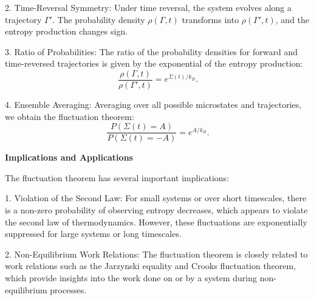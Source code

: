 \begin{appendices}
2. Time-Reversal Symmetry: Under time reversal, the system evolves along a trajectory $\Gamma'$. The probability density $\rho(\Gamma, t)$ transforms into $\rho(\Gamma', t)$, and the entropy production changes sign.

3. Ratio of Probabilities: The ratio of the probability densities for forward and time-reversed trajectories is given by the exponential of the entropy production:
\begin{equation}
	\frac{\rho(\Gamma, t)}{\rho(\Gamma', t)} = e^{\Sigma(t)/k_B}.
\end{equation}

4. Ensemble Averaging: Averaging over all possible microstates and trajectories, we obtain the fluctuation theorem:
\begin{equation}
	\frac{P(\Sigma(t) = A)}{P(\Sigma(t) = -A)} = e^{A/k_B}.
\end{equation}

\textbf{Implications and Applications}

The fluctuation theorem has several important implications:

1. Violation of the Second Law: For small systems or over short timescales, there is a non-zero probability of observing entropy decreases, which appears to violate the second law of thermodynamics. However, these fluctuations are exponentially suppressed for large systems or long timescales.

2. Non-Equilibrium Work Relations: The fluctuation theorem is closely related to work relations such as the Jarzynski equality\cite{JarzynskiPRL1997} and Crooks fluctuation theorem\cite{CrooksPRE1999}, which provide insights into the work done on or by a system during non-equilibrium processes.


\end{appendices}
